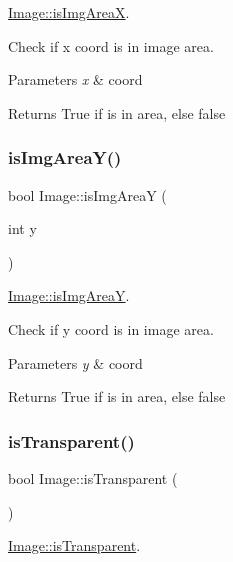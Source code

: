 \mbox{\hyperlink{class_image_a176645fd2b8695127beb87861a3bff05}{Image\+::is\+Img\+AreaX}}. 

Check if x coord is in image area. 
\begin{DoxyParams}{Parameters}
{\em x} & coord \\
\hline
\end{DoxyParams}
\begin{DoxyReturn}{Returns}
True if is in area, else false 
\end{DoxyReturn}
\mbox{\label{class_image_ae54b7b084b648d561244ec047565c1fb}} 
\subsubsection{\texorpdfstring{isImgAreaY()}{isImgAreaY()}}
{\footnotesize\ttfamily bool Image\+::is\+Img\+AreaY (\begin{DoxyParamCaption}\item[{int}]{y }\end{DoxyParamCaption})}



\mbox{\hyperlink{class_image_ae54b7b084b648d561244ec047565c1fb}{Image\+::is\+Img\+AreaY}}. 

Check if y coord is in image area. 
\begin{DoxyParams}{Parameters}
{\em y} & coord \\
\hline
\end{DoxyParams}
\begin{DoxyReturn}{Returns}
True if is in area, else false 
\end{DoxyReturn}
\mbox{\label{class_image_a2bfbc65ec280b866411462f7b452ce76}} 
\subsubsection{\texorpdfstring{isTransparent()}{isTransparent()}}
{\footnotesize\ttfamily bool Image\+::is\+Transparent (\begin{DoxyParamCaption}{ }\end{DoxyParamCaption})}



\mbox{\hyperlink{class_image_a2bfbc65ec280b866411462f7b452ce76}{Image\+::is\+Transparent}}. 

